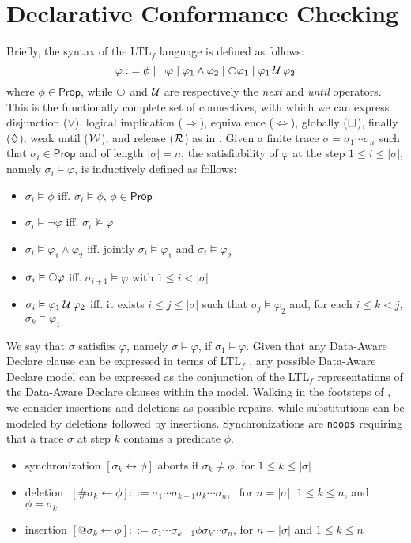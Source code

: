 \section{Declarative Conformance Checking}\label{sec:dccap}
Briefly, the syntax of the LTL$_f$ language is defined as follows:
\[\varphi::=\phi\;|\;\neg \varphi\;|\;\varphi_1\wedge\varphi_2\;|\;\Next \varphi_1\;|\;\varphi_1\Until\varphi_2\]
where $\phi\in \mathsf{Prop}$, while $\Next$ and $\mathbin{\mathcal{U}}$ are respectively the \textit{next} and \textit{until} operators. This is the functionally complete set of connectives, with which we can express  disjunction ($\vee$),  logical implication ($\Rightarrow$),  equivalence ($\Leftrightarrow$), globally ($\square$), finally ($\lozenge$), weak until ($\mathbin{\mathcal{W}}$), and release ($\mathbin{\mathcal{R}}$) as in \cite{XuLZ17a}. Given a finite trace $\sigma=\sigma_1\cdots \sigma_n$ such that $\sigma_i\in\mathsf{Prop}$ and of length $|\sigma|=n$, the satisfiability of $\varphi$ at the step $1\leq i\leq |\sigma|$, namely $\sigma_i\vDash \varphi$, is inductively defined as follows:
\begin{itemize}
	\item $\sigma_i\vDash\phi$ iff. $\sigma_i\vDash\phi$, $\phi\in \mathsf{Prop}$
	\item $\sigma_i\vDash\neg\varphi$ iff. $\sigma_i\not\vDash\varphi$
	\item $\sigma_i\vDash\varphi_1\wedge\varphi_2$ iff. jointly $\sigma_i\vDash\varphi_1$ and $\sigma_i\vDash\varphi_2$
	\item $\sigma_i\vDash\Next\varphi$ iff. $\sigma_{i+1}\vDash\varphi$ with $1\leq i< |\sigma|$
	\item $\sigma_i\vDash\varphi_1\mathbin{\mathcal{U}}\varphi_2$ iff. it exists $i\leq j\leq |\sigma|$ such that $\sigma_j\vDash\varphi_2$ and, for each $i\leq k<j$, $\sigma_k\vDash\varphi_1$
\end{itemize}
We say that $\sigma$ satisfies $\varphi$, namely $\sigma\vDash\varphi$, if $\sigma_1\vDash\varphi$. Given that any Data-Aware Declare clause can be expressed in terms of LTL$_f$ \cite{10.1007/978-3-642-40176-3_8}, any possible Data-Aware Declare model can be expressed as the conjunction of the LTL$_f$ representations of the Data-Aware Declare clauses within the model. Walking in the footsteps of \cite{XuLZ17a}, we consider insertions and deletions as possible repairs, while substitutions can be modeled by deletions followed by insertions. Synchronizations are \texttt{noops} requiring that a trace $\sigma$ at step $k$ contains a predicate $\phi$. 
\begin{itemize}
	\item synchronization $[\sigma_k\leftrightarrow \phi]$ aborts if $\sigma_k\neq\phi$, for  $1\leq k\leq |\sigma|$
	\item deletion\,\, $[\#\sigma_k\leftarrow \phi]::= \sigma_1\cdots\sigma_{k-1}\sigma_{k}\cdots \sigma_n$,\,\,\, for $n=|\sigma|$, $1\leq k\leq n$, and $\phi=\sigma_k$
	\item insertion $[@\sigma_k\leftarrow \phi]::= \sigma_1\cdots\sigma_{k-1}\phi\sigma_{k}\cdots \sigma_n$, for $n=|\sigma|$ and $1\leq k\leq n$
\end{itemize}

